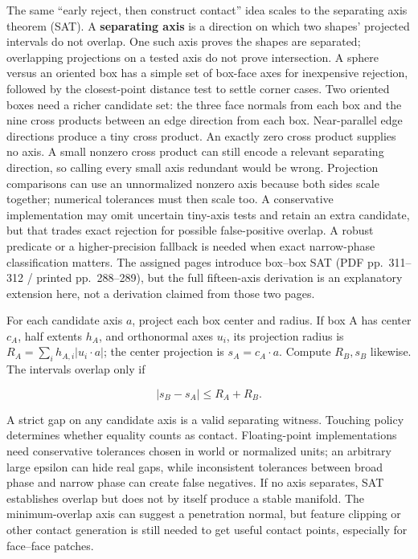 The same ``early reject, then construct contact'' idea scales to the separating axis theorem (SAT). A \textbf{separating axis} is a direction on which two shapes' projected intervals do not overlap. One such axis proves the shapes are separated; overlapping projections on a tested axis do not prove intersection. A sphere versus an oriented box has a simple set of box-face axes for inexpensive rejection, followed by the closest-point distance test to settle corner cases. Two oriented boxes need a richer candidate set: the three face normals from each box and the nine cross products between an edge direction from each box. Near-parallel edge directions produce a tiny cross product. An exactly zero cross product supplies no axis. A small nonzero cross product can still encode a relevant separating direction, so calling every small axis redundant would be wrong. Projection comparisons can use an unnormalized nonzero axis because both sides scale together; numerical tolerances must then scale too. A conservative implementation may omit uncertain tiny-axis tests and retain an extra candidate, but that trades exact rejection for possible false-positive overlap. A robust predicate or a higher-precision fallback is needed when exact narrow-phase classification matters. The assigned pages introduce box--box SAT (PDF pp.~311--312 / printed pp.~288--289), but the full fifteen-axis derivation is an explanatory extension here, not a derivation claimed from those two pages.

For each candidate axis \(a\), project each box center and radius. If box A has center \(c_A\), half extents \(h_A\), and orthonormal axes \(u_i\), its projection radius is \(R_A=\sum_i h_{A,i}|u_i\cdot a|\); the center projection is \(s_A=c_A\cdot a\). Compute \(R_B,s_B\) likewise. The intervals overlap only if

\[
|s_B-s_A|\le R_A+R_B.
\]

A strict gap on any candidate axis is a valid separating witness. Touching policy determines whether equality counts as contact. Floating-point implementations need conservative tolerances chosen in world or normalized units; an arbitrary large epsilon can hide real gaps, while inconsistent tolerances between broad phase and narrow phase can create false negatives. If no axis separates, SAT establishes overlap but does not by itself produce a stable manifold. The minimum-overlap axis can suggest a penetration normal, but feature clipping or other contact generation is still needed to get useful contact points, especially for face--face patches.

